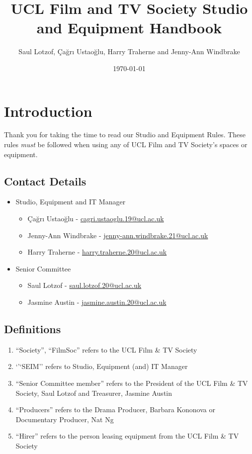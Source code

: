 \documentclass[]{article}
\begin{document}
\title{UCL Film and TV Society Studio and Equipment Handbook}
\author {Saul Lotzof, Çağrı Ustaoğlu, Harry Traherne and Jenny-Ann Windbrake}
\date{\today}
\maketitle
\tableofcontents
\section{Introduction}
Thank you for taking the time to read our Studio and Equipment Rules. These rules \textit{must} be followed when using any of UCL Film and TV Society's spaces or equipment.
\subsection{Contact Details}
\begin{itemize}
    \item Studio, Equipment and IT Manager
          \begin{itemize}
              \item Çağrı Ustaoğlu - \href{mailto:cagri.ustaoglu.19@ucl.ac.uk}{cagri.ustaoglu.19@ucl.ac.uk}
              \item Jenny-Ann Windbrake - \href{mailto:zctyjlw@ucl.ac.uk}{jenny-ann.windbrake.21@ucl.ac.uk}
              \item Harry Traherne - \href{mailto:harry.traherne.20@ucl.ac.uk}{harry.traherne.20@ucl.ac.uk}
          \end{itemize}
    \item Senior Committee
          \begin{itemize}
              \item Saul Lotzof - \href{mailto:saul.lotzof.20@ucl.ac.uk}{saul.lotzof.20@ucl.ac.uk}
              \item Jasmine Austin - \href{mailto:jasmine.austin.20@ucl.ac.uk}{jasmine.austin.20@ucl.ac.uk}
          \end{itemize}
\end{itemize}
\subsection{Definitions}
\begin{enumerate}
    \item ``Society'', ``FilmSoc'' refers to the UCL Film \& TV Society
    \item `'`SEIM'' refers to Studio, Equipment (and) IT Manager
    \item ``Senior Committee member'' refers to the President of the UCL Film \& TV Society, Saul Lotzof and Treasurer, Jasmine Austin
    \item ``Producers'' refers to the Drama Producer, Barbara Kononova or Documentary Producer, Nat Ng
    \item ``Hirer'' refers to the person leasing equipment from the UCL Film \& TV Society
\end{enumerate}
\end{document}
